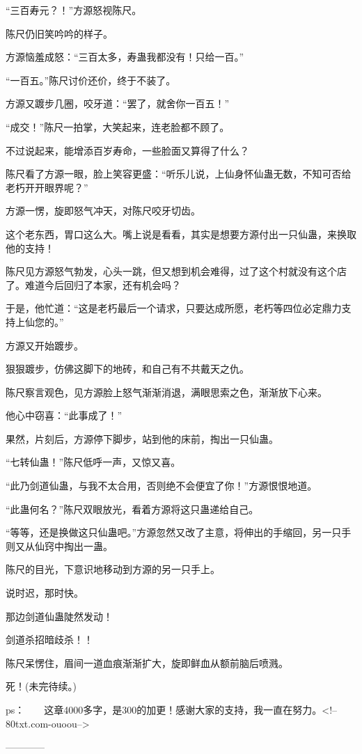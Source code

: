 \begin{this_body}
“三百寿元？！”方源怒视陈尺。

陈尺仍旧笑吟吟的样子。

方源恼羞成怒：“三百太多，寿蛊我都没有！只给一百。”

“一百五。”陈尺讨价还价，终于不装了。

方源又踱步几圈，咬牙道：“罢了，就舍你一百五！”

“成交！”陈尺一拍掌，大笑起来，连老脸都不顾了。

不过说起来，能增添百岁寿命，一些脸面又算得了什么？

陈尺看了方源一眼，脸上笑容更盛：“听乐儿说，上仙身怀仙蛊无数，不知可否给老朽开开眼界呢？”

方源一愣，旋即怒气冲天，对陈尺咬牙切齿。

这个老东西，胃口这么大。嘴上说是看看，其实是想要方源付出一只仙蛊，来换取他的支持！

陈尺见方源怒气勃发，心头一跳，但又想到机会难得，过了这个村就没有这个店了。难道今后回归了本家，还有机会吗？

于是，他忙道：“这是老朽最后一个请求，只要达成所愿，老朽等四位必定鼎力支持上仙您的。”

方源又开始踱步。

狠狠踱步，仿佛这脚下的地砖，和自己有不共戴天之仇。

陈尺察言观色，见方源脸上怒气渐渐消退，满眼思索之色，渐渐放下心来。

他心中窃喜：“此事成了！”

果然，片刻后，方源停下脚步，站到他的床前，掏出一只仙蛊。

“七转仙蛊！”陈尺低呼一声，又惊又喜。

“此乃剑道仙蛊，与我不太合用，否则绝不会便宜了你！”方源恨恨地道。

“此蛊何名？”陈尺双眼放光，看着方源将这只蛊递给自己。

“等等，还是换做这只仙蛊吧。”方源忽然又改了主意，将伸出的手缩回，另一只手则又从仙窍中掏出一蛊。

陈尺的目光，下意识地移动到方源的另一只手上。

说时迟，那时快。

那边剑道仙蛊陡然发动！

剑道杀招暗歧杀！！

陈尺呆愣住，眉间一道血痕渐渐扩大，旋即鲜血从额前脑后喷溅。

死！(未完待续。)

ps：　　这章4000多字，是300的加更！感谢大家的支持，我一直在努力。<!--80txt.com-ouoou-->

------------

\end{this_body}

